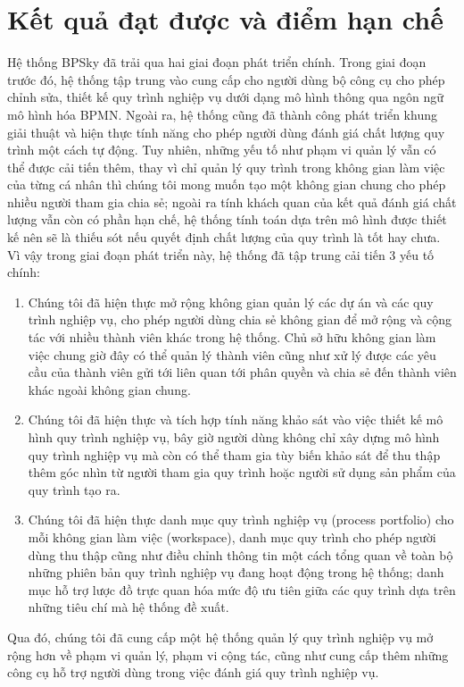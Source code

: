 \section{Kết quả đạt được và điểm hạn chế}
Hệ thống BPSky đã trải qua hai giai đoạn phát triển chính. Trong giai đoạn trước đó, hệ thống tập trung vào cung cấp cho người dùng bộ công cụ cho phép chỉnh sửa, thiết kế quy trình nghiệp vụ dưới dạng mô hình thông qua ngôn ngữ mô hình hóa BPMN. Ngoài ra, hệ thống cũng đã thành công phát triển khung giải thuật và hiện thực tính năng cho phép người dùng đánh giá chất lượng quy trình một cách tự động. Tuy nhiên, những yếu tố như phạm vi quản lý vẫn có thể được cải tiến thêm, thay vì chỉ quản lý quy trình trong không gian làm việc của từng cá nhân thì chúng tôi mong muốn tạo một không gian chung cho phép nhiều người tham gia chia sẻ; ngoài ra tính khách quan của kết quả đánh giá chất lượng vẫn còn có phần hạn chế, hệ thống tính toán dựa trên mô hình được thiết kế nên sẽ là thiếu sót nếu quyết định chất lượng của quy trình là tốt hay chưa. Vì vậy trong giai đoạn phát triển này, hệ thống đã tập trung cải tiến 3 yếu tố chính:
\begin{enumerate}
    \item Chúng tôi đã hiện thực mở rộng không gian quản lý các dự án và các quy trình nghiệp vụ, cho phép người dùng chia sẻ không gian để mở rộng và cộng tác với nhiều thành viên khác trong hệ thống. Chủ sở hữu không gian làm việc chung giờ đây có thể quản lý thành viên cũng như xử lý được các yêu cầu của thành viên gửi tới liên quan tới phân quyền và chia sẻ đến thành viên khác ngoài không gian chung.
    \item Chúng tôi đã hiện thực và tích hợp tính năng khảo sát vào việc thiết kế mô hình quy trình nghiệp vụ, bây giờ người dùng không chỉ xây dựng mô hình quy trình nghiệp vụ mà còn có thể tham gia tùy biến khảo sát để thu thập thêm góc nhìn từ người tham gia quy trình hoặc người sử dụng sản phẩm của quy trình tạo ra.
    \item Chúng tôi đã hiện thực danh mục quy trình nghiệp vụ (process portfolio) cho mỗi không gian làm việc (workspace), danh mục quy trình cho phép người dùng thu thập cũng như điều chỉnh thông tin một cách tổng quan về toàn bộ những phiên bản quy trình nghiệp vụ đang hoạt động trong hệ thống; danh mục hỗ trợ lược đồ trực quan hóa mức độ ưu tiên giữa các quy trình dựa trên những tiêu chí mà hệ thống đề xuất.
\end{enumerate}
Qua đó, chúng tôi đã cung cấp một hệ thống quản lý quy trình nghiệp vụ mở rộng hơn về phạm vi quản lý, phạm vi cộng tác, cũng như cung cấp thêm những công cụ hỗ trợ người dùng trong việc đánh giá quy trình nghiệp vụ.
